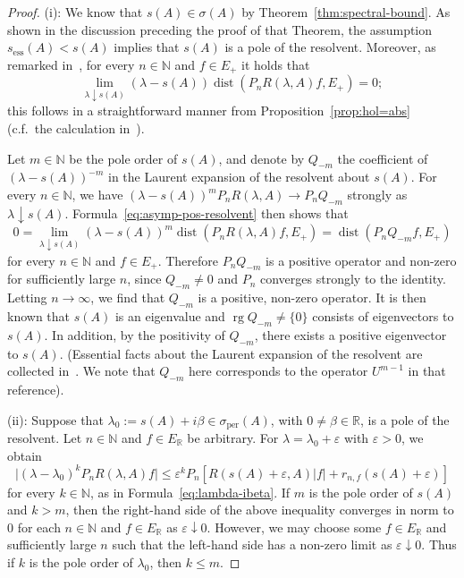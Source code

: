 \documentclass[sn-mathphys]{sn-jnl}%
\theoremstyle{thmstyleone}
\theoremstyle{thmstylethree}
\DeclareMathOperator{\rg}{rg}
\DeclareMathOperator{\dist}{dist}
\newcommand{\NN}{\mathbb{N}}
\newcommand{\RR}{\mathbb{R}}
\begin{document}
\begin{proof}
	(i): We know that $s(A)\in\sigma(A)$ by Theorem~\ref{thm:spectral-bound}. As shown in the discussion preceding the proof of that Theorem, the assumption $s_{\mathrm{ess}}(A)<s(A)$ implies that $s(A)$ is a pole of the resolvent. Moreover, as remarked in~\cite[Corollary 6.2]{Ar21}, for every $n\in\NN$ and $f\in E_+$ it holds that
	\begin{equation}
		\label{eq:asymp-pos-resolvent}
		\lim_{\lambda\downarrow s(A)} (\lambda-s(A)) \dist(P_nR(\lambda,A)f, E_+) = 0;
	\end{equation}
	this follows in a straightforward manner from Proposition~\ref{prop:hol=abs} (c.f.~the calculation in~\cite[Corollary 7.3]{DGK1}).
	
	Let $m\in\NN$ be the pole order of $s(A)$, and denote by $Q_{-m}$ the coefficient of $(\lambda-s(A))^{-m}$ in the Laurent expansion of the resolvent about $s(A)$. For every $n\in\NN$, we have $(\lambda-s(A))^m P_n R(\lambda,A) \to P_n Q_{-m}$ strongly as $\lambda\downarrow s(A)$. Formula~\eqref{eq:asymp-pos-resolvent} then shows that
	\begin{equation*}
		0 = \lim_{\lambda\downarrow s(A)} (\lambda-s(A))^m \dist(P_nR(\lambda,A)f, E_+) = \dist(P_n Q_{-m}f, E_+)
	\end{equation*}
	for every $n\in\NN$ and $f\in E_+$. Therefore $P_n Q_{-m}$ is a positive operator and non-zero for sufficiently large $n$, since $Q_{-m}\ne 0$ and $P_n$ converges strongly to the identity. Letting $n\to\infty$, we find that $Q_{-m}$ is a positive, non-zero operator. It is then known that $s(A)$ is an eigenvalue and $\rg Q_{-m}\ne\{0\}$ consists of eigenvectors to $s(A)$. In addition, by the positivity of $Q_{-m}$, there exists a positive eigenvector to $s(A)$. (Essential facts about the Laurent expansion of the resolvent are collected in~\cite[Remark 2.1]{DGK1}. We note that $Q_{-m}$ here corresponds to the operator $U^{m-1}$ in that reference).
	
	(ii): Suppose that $\lambda_0:=s(A)+i\beta\in\sigma_{\mathrm{per}}(A)$, with $0\ne\beta\in\RR$, is a pole of the resolvent. Let $n\in\NN$ and $f\in E_\RR$ be arbitrary. For $\lambda=\lambda_0+\varepsilon$ with $\varepsilon>0$, we obtain
	\begin{equation*}
		\lvert(\lambda-\lambda_0)^k P_n R(\lambda,A)f\rvert \le \varepsilon^k P_n[R(s(A)+\varepsilon,A)\lvert f\rvert+r_{n,f}(s(A)+\varepsilon)]
	\end{equation*}
	for every $k\in\NN$, as in Formula~\eqref{eq:lambda-ibeta}. If $m$ is the pole order of $s(A)$ and $k>m$, then the right-hand side of the above inequality converges in norm to $0$ for each $n\in\NN$ and $f\in E_\RR$ as $\varepsilon\downarrow 0$. However, we may choose some $f\in E_\RR$ and sufficiently large $n$ such that the left-hand side has a non-zero limit as $\varepsilon\downarrow 0$. Thus if $k$ is the pole order of $\lambda_0$, then $k\le m$.
\end{proof}
\end{document}
